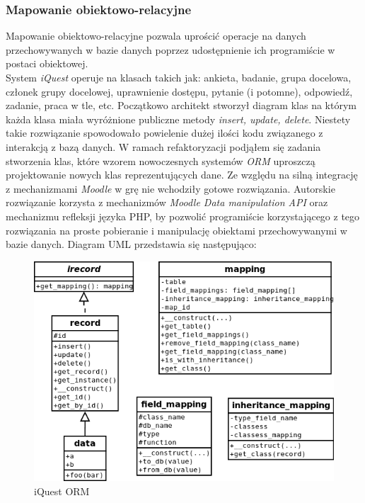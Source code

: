 \subsubsection{Mapowanie obiektowo-relacyjne}
Mapowanie obiektowo-relacyjne pozwala uprościć operacje na danych przechowywanych w bazie danych poprzez udostępnienie ich programiście w postaci obiektowej.\\
System \emph{iQuest} operuje na klasach takich jak: ankieta, badanie, grupa docelowa, członek grupy docelowej, uprawnienie dostępu, pytanie (i potomne), odpowiedź, zadanie, praca w tle, etc. Początkowo architekt stworzył diagram klas na którym każda klasa miała wyróżnione publiczne metody \emph{insert, update, delete}. Niestety takie rozwiązanie spowodowało powielenie dużej ilości kodu związanego z interakcją z bazą danych. W ramach refaktoryzacji podjąłem się zadania stworzenia klas, które wzorem nowoczesnych systemów \emph{ORM} uproszczą projektowanie nowych klas reprezentujących dane. Ze względu na silną integrację z mechanizmami \emph{Moodle} w grę nie wchodziły gotowe rozwiązania. Autorskie rozwiązanie korzysta z mechanizmów \emph{Moodle Data manipulation API} oraz mechanizmu refleksji języka PHP, by pozwolić programiście korzystającego z tego rozwiązania na proste pobieranie i manipulację obiektami przechowywanymi w bazie danych. Diagram UML przedstawia się następująco:
\begin{figure}[!th]
\centering\includegraphics[width=15cm]{figures/lw/iquest-orm.png}
\caption{iQuest ORM}\label{rys:iquest-orm}
\end{figure}

